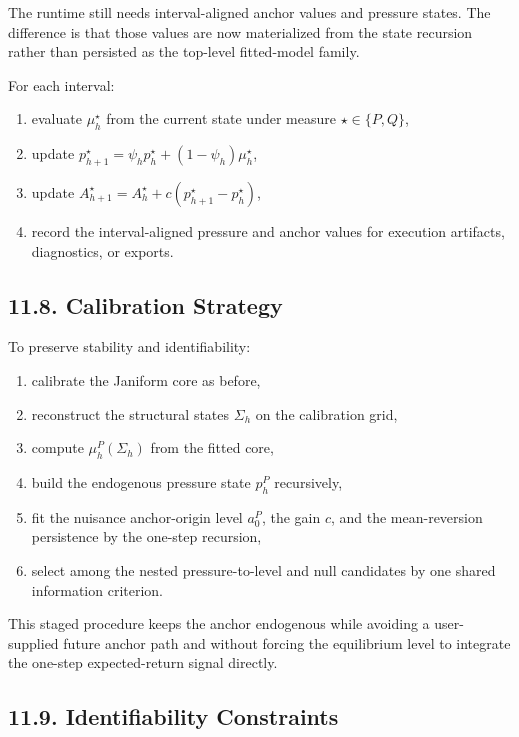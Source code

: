 \documentclass[11pt]{article}
\begin{document}
    The runtime still needs interval-aligned anchor values and pressure states.
    The difference is that those values are now materialized from the state
    recursion rather than persisted as the top-level fitted-model family.

    For each interval:
    \begin{enumerate}
        \item evaluate \(\mu_h^\star\) from the current state under measure
        \(\star\in\{P,Q\}\),
        \item update \(p_{h+1}^\star = \psi_h p_h^\star + (1-\psi_h)\mu_h^\star\),
        \item update \(A_{h+1}^\star = A_h^\star + c(p_{h+1}^\star - p_h^\star)\),
        \item record the interval-aligned pressure and anchor values for
        execution artifacts, diagnostics, or exports.
    \end{enumerate}

    \subsection*{11.8. Calibration Strategy}

    To preserve stability and identifiability:
    \begin{enumerate}
        \item calibrate the Janiform core as before,
        \item reconstruct the structural states \(\Sigma_h\) on the calibration
        grid,
        \item compute \(\mu_h^P(\Sigma_h)\) from the fitted core,
        \item build the endogenous pressure state \(p_h^P\) recursively,
        \item fit the nuisance anchor-origin level \(a_0^P\), the gain \(c\),
        and the mean-reversion persistence by the one-step recursion,
        \item select among the nested pressure-to-level and null candidates by
        one shared information criterion.
    \end{enumerate}

    This staged procedure keeps the anchor endogenous while avoiding a user-
    supplied future anchor path and without forcing the equilibrium level to
    integrate the one-step expected-return signal directly.

    \subsection*{11.9. Identifiability Constraints}
\end{document}
